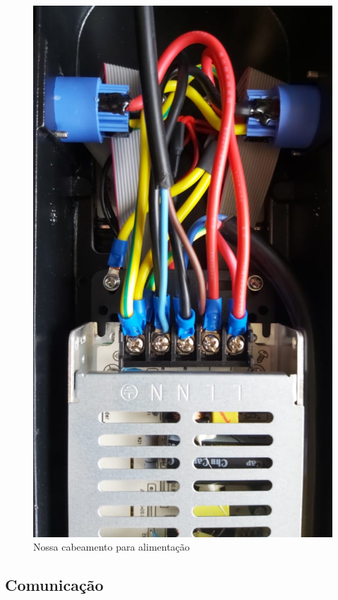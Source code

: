 \documentclass[12pt, a4paper]{article}
\begin{document}
\begin{figure}[!htb]
	\centering
	\includegraphics[height=.88\textheight]{painel2.jpeg}
	\caption{\label{fig:painel2.jpeg}Nossa cabeamento para alimentação}
\end{figure}

\clearpage

\subsection{Comunicação}\label{Comunicação}
\end{document}
